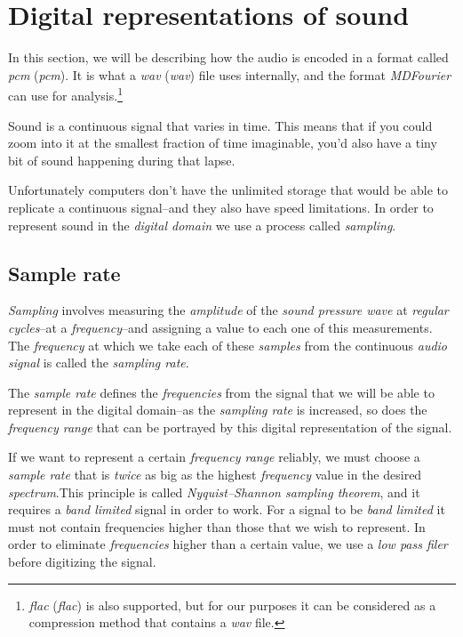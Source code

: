 \documentclass[10pt,a4paper]{report}
\newcommand{\define}[1]{\textit{\acrlong{#1}} (\textit{\acrshort{#1}})}
\newcommand{\ac}[1]{\textit{\mbox{\acrshort{#1}}}}
\begin{document}
\section{Digital representations of sound}

In this section, we will be describing how the audio is encoded in a format called \define{pcm}. It is what a \define{wav} file uses internally, and the format \textit{MDFourier} can use for analysis.\footnote{\define{flac} is also supported, but for our purposes it can be considered as a compression method that contains a \ac{wav} file.}

Sound is a continuous signal that varies in time. This means that if you could zoom into it at the smallest fraction of time imaginable, you'd also have a tiny bit of sound happening during that lapse. 

Unfortunately computers don't have the unlimited storage that would be able to replicate a continuous signal--and they also have speed limitations. In order to represent sound in the \textit{digital domain} we use a process called \textit{sampling}. 

\subsection{Sample rate}

\textit{Sampling} involves measuring the \textit{amplitude} of the \textit{sound pressure wave} at \textit{regular cycles}--at a \textit{frequency}--and assigning a value to each one of this measurements. The \textit{frequency} at which we take each of these \textit{samples} from the continuous \textit{audio signal} is called the \textit{sampling rate}. 

The \textit{sample rate} defines the \textit{frequencies} from the signal that we will be able to represent in the digital domain--as the \textit{sampling rate} is increased, so does the \textit{frequency range} that can be portrayed by this digital representation of the signal. 

If we want to represent a certain \textit{frequency range} reliably, we must choose a \textit{sample rate} that is \textit{twice} as big as the highest \textit{frequency} value in the desired \textit{spectrum}.This principle is called  \textit{Nyquist–Shannon sampling theorem}, and it requires a \textit{band limited} signal in order to work. For a signal to be \textit{band limited} it must not contain frequencies higher than those that we wish to represent. In order to eliminate \textit{frequencies} higher than a certain value, we use a \textit{low pass filer} before digitizing the signal.
\end{document}
